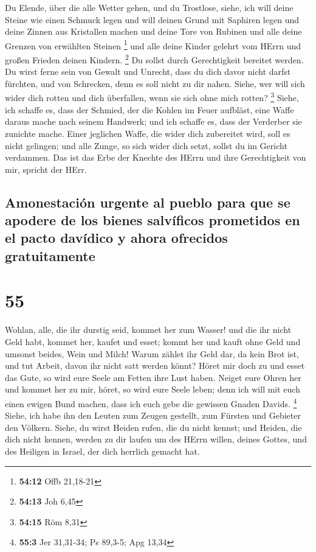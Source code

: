  Du Elende, über die alle Wetter gehen, und du Trostlose,
siehe, ich will deine Steine wie einen Schmuck legen und will deinen
Grund mit Saphiren legen  und deine Zinnen aus Kristallen
machen und deine Tore von Rubinen und alle deine Grenzen von erwählten
Steinen \footnote{\textbf{54:12} Offb 21,18-21}  und alle
deine Kinder gelehrt vom HErrn und großen Frieden deinen Kindern.
\footnote{\textbf{54:13} Joh 6,45}  Du sollst durch
Gerechtigkeit bereitet werden. Du wirst ferne sein von Gewalt und
Unrecht, dass du dich davor nicht darfst fürchten, und von Schrecken,
denn es soll nicht zu dir nahen.  Siehe, wer will sich
wider dich rotten und dich überfallen, wenn sie sich ohne mich rotten?
\footnote{\textbf{54:15} Röm 8,31}  Siehe, ich schaffe
es, dass der Schmied, der die Kohlen im Feuer aufbläst, eine Waffe
daraus mache nach seinem Handwerk; und ich schaffe es, dass der
Verderber sie zunichte mache.  Einer jeglichen Waffe, die
wider dich zubereitet wird, soll es nicht gelingen; und alle Zunge, so
sich wider dich setzt, sollst du im Gericht verdammen. Das ist das Erbe
der Knechte des HErrn und ihre Gerechtigkeit von mir, spricht der HErr.

\hypertarget{amonestaciuxf3n-urgente-al-pueblo-para-que-se-apodere-de-los-bienes-salvuxedficos-prometidos-en-el-pacto-davuxeddico-y-ahora-ofrecidos-gratuitamente}{%
\subsection{Amonestación urgente al pueblo para que se apodere de los
bienes salvíficos prometidos en el pacto davídico y ahora ofrecidos
gratuitamente}\label{amonestaciuxf3n-urgente-al-pueblo-para-que-se-apodere-de-los-bienes-salvuxedficos-prometidos-en-el-pacto-davuxeddico-y-ahora-ofrecidos-gratuitamente}}

\hypertarget{section-54}{%
\section{55}\label{section-54}}

 Wohlan, alle, die ihr durstig seid, kommet her zum
Wasser! und die ihr nicht Geld habt, kommet her, kaufet und esset; kommt
her und kauft ohne Geld und umsonst beides, Wein und Milch!
 Warum zählet ihr Geld dar, da kein Brot ist, und tut
Arbeit, davon ihr nicht satt werden könnt? Höret mir doch zu und esset
das Gute, so wird eure Seele am Fetten ihre Lust haben. 
Neiget eure Ohren her und kommet her zu mir, höret, so wird eure Seele
leben; denn ich will mit euch einen ewigen Bund machen, dass ich euch
gebe die gewissen Gnaden Davids. \footnote{\textbf{55:3} Jer 31,31-34;
  Ps 89,3-5; Apg 13,34}  Siehe, ich habe ihn den Leuten
zum Zeugen gestellt, zum Fürsten und Gebieter den Völkern.
 Siehe, du wirst Heiden rufen, die du nicht kennst; und
Heiden, die dich nicht kennen, werden zu dir laufen um des HErrn willen,
deines Gottes, und des Heiligen in Israel, der dich herrlich gemacht
hat.

